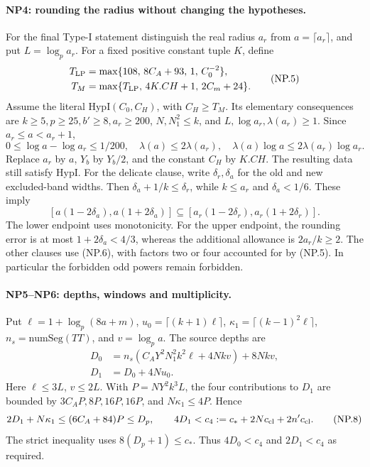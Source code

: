 \documentclass[11pt,a4paper]{article}
\numberwithin{equation}{section}
\theoremstyle{remark}\newtheorem{remark}[theorem]{Remark}
\begin{document}
\paragraph{NP4: rounding the radius without changing the hypotheses.}
For the final Type-I statement distinguish the real radius $a_r$ from
$a=\lceil a_r\rceil$, and put $L=\log_pa_r$.
For a fixed positive constant tuple $K$, define
\[
 \begin{split}
 T_{\rm LP}&=\max\{108,\,8C_A+93,\,1,\,C_0^{-2}\},\\
 T_M&=\max\{T_{\rm LP},\,4K.CH+1,\,2C_m+24\}.
 \end{split}                                         \tag{NP.5}
\]
Assume the literal $\mathrm{HypI}(C_0,C_H)$, with $C_H\ge T_M$.
Its elementary consequences are $k\ge5,p\ge25,b'\ge8,a_r\ge200$,
$N,N_1^2\le k$, and $L,\log a_r,\lambda(a_r)\ge1$.
Since $a_r\le a<a_r+1$,
\[
 0\le\log a-\log a_r\le1/200,\quad
 \lambda(a)\le2\lambda(a_r),\quad
 \lambda(a)\log a\le2\lambda(a_r)\log a_r.          \tag{NP.6}
\]
Replace $a_r$ by $a$, $Y_b$ by $Y_b/2$, and the constant $C_H$ by
$K.CH$. The resulting data still satisfy $\mathrm{HypI}$.
For the delicate clause, write $\delta_r,\delta_a$ for the
old and new excluded-band widths. Then
$\delta_a+1/k\le\delta_r$, while $k\le a_r$ and $\delta_a<1/6$.
These imply
\[
 [a(1-2\delta_a),a(1+2\delta_a)]
 \subseteq[a_r(1-2\delta_r),a_r(1+2\delta_r)].        \tag{NP.7}
\]
The lower endpoint uses monotonicity. For the upper endpoint,
the rounding error is at most $1+2\delta_a<4/3$, whereas the
additional allowance is $2a_r/k\ge2$.
The other clauses use (NP.6), with factors two or four accounted for
by (NP.5). In particular the forbidden odd powers remain forbidden.

\paragraph{NP5--NP6: depths, windows and multiplicity.}
Put $\ell=1+\log_p(8a+m)$, $u_0=\lceil(k+1)\ell\rceil$,
$\kappa_1=\lceil(k-1)^2\ell\rceil$, $n_s=\mathrm{numSeg}(TT)$,
and $v=\log_pa$. The source depths are
\[
 \begin{split}
 D_0&=n_s(C_AY^2N_1^2k^2\ell+4Nkv)+8Nkv,\\
 D_1&=D_0+4Nu_0.
 \end{split}
\]
Here $\ell\le3L$, $v\le2L$. With $P=NY^2k^3L$, the four contributions
to $D_1$ are bounded by $3C_AP,8P,16P,16P$, and
$N\kappa_1\le4P$. Hence
\[
 2D_1+N\kappa_1\le(6C_A+84)P\le D_p,\qquad
 4D_1<c_4:=c_*+2Nc_{\rm cl}+2n'c_{\rm cl}.           \tag{NP.8}
\]
The strict inequality uses $8(D_p+1)\le c_*$.
Thus $4D_0<c_4$ and $2D_1<c_4$ as required.
\end{document}
